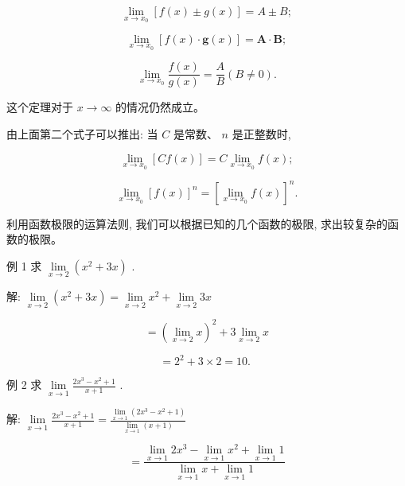 \documentclass[lang=cn,newtx,12pt,scheme=chinese]{elegantbook}
\begin{document}
\[
\mathop{\lim }\limits_{{x \rightarrow {x}_{0}}}\left\lbrack {f\left( x\right) \pm g\left( x\right) }\right\rbrack = A \pm B;
\]

\[
\mathop{\lim }\limits_{{x \rightarrow {x}_{0}}}\left\lbrack {f\left( x\right) \cdot \mathbf{g}\left( x\right) }\right\rbrack = \mathbf{A} \cdot \mathbf{B};
\]

\[
\mathop{\lim }\limits_{{x \rightarrow {x}_{0}}}\frac{f\left( x\right) }{g\left( x\right) } = \frac{A}{B}\left( {B \neq 0}\right) .
\]

这个定理对于 \(x \rightarrow \infty\) 的情况仍然成立。

由上面第二个式子可以推出: 当 \(C\) 是常数、 \(n\) 是正整数时,

\[
\mathop{\lim }\limits_{{x \rightarrow {x}_{0}}}\left\lbrack {{Cf}\left( x\right) }\right\rbrack = C\mathop{\lim }\limits_{{x \rightarrow {x}_{0}}}f\left( x\right) ;
\]

\[
\mathop{\lim }\limits_{{x \rightarrow {x}_{0}}}{\left\lbrack f\left( x\right) \right\rbrack }^{n} = {\left\lbrack \mathop{\lim }\limits_{{x \rightarrow {x}_{0}}}f\left( x\right) \right\rbrack }^{n}.
\]

利用函数极限的运算法则, 我们可以根据已知的几个函数的极限, 求出较复杂的函数的极限。

例 1 求 \(\mathop{\lim }\limits_{{x \rightarrow 2}}\left( {{x}^{2} + {3x}}\right)\) .

解: \(\mathop{\lim }\limits_{{x \rightarrow 2}}\left( {{x}^{2} + {3x}}\right) = \mathop{\lim }\limits_{{x \rightarrow 2}}{x}^{2} + \mathop{\lim }\limits_{{x \rightarrow 2}}{3x}\)

\[
= {\left( \mathop{\lim }\limits_{{x \rightarrow 2}}x\right) }^{2} + 3\mathop{\lim }\limits_{{x \rightarrow 2}}x
\]

\[
= {2}^{2} + 3 \times 2 = {10}\text{. }
\]

例 2 求 \(\mathop{\lim }\limits_{{x \rightarrow 1}}\frac{2{x}^{3} - {x}^{2} + 1}{x + 1}\) .

解: \(\mathop{\lim }\limits_{{x \rightarrow 1}}\frac{2{x}^{3} - {x}^{2} + 1}{x + 1} = \frac{\mathop{\lim }\limits_{{x \rightarrow 1}}\left( {2{x}^{3} - {x}^{2} + 1}\right) }{\mathop{\lim }\limits_{{x \rightarrow 1}}\left( {x + 1}\right) }\)

\[
= \frac{\mathop{\lim }\limits_{{x \rightarrow 1}}2{x}^{3} - \mathop{\lim }\limits_{{x \rightarrow 1}}{x}^{2} + \mathop{\lim }\limits_{{x \rightarrow 1}}1}{\mathop{\lim }\limits_{{x \rightarrow 1}}x + \mathop{\lim }\limits_{{x \rightarrow 1}}1}
\]
\end{document}
